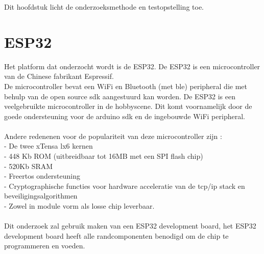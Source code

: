 \documentclass[../DCM2_Verslag.tex]{subfiles}
\begin{document}
Dit hoofdstuk licht de onderzoeksmethode en testopstelling toe. 

\section{ESP32}
Het platform dat onderzocht wordt is de ESP32. De ESP32 is een microcontroller van de Chinese fabrikant Espressif.\\ De microcontroller bevat een WiFi en Bluetooth (met ble) peripheral die met behulp van de open source sdk aangestuurd kan worden. De ESP32 is een veelgebruikte microcontroller in de hobbyscene. Dit komt voornamelijk door de goede ondersteuning voor de arduino sdk en de ingebouwde WiFi peripheral.
\\\\
Andere redenenen voor de populariteit van deze microcontroller zijn \parencite{esptechref}:\\
- De twee xTensa lx6 kernen\\
- 448 Kb ROM (uitbreidbaar tot 16MB met een SPI flash chip)\\
- 520Kb SRAM\\
- Freertos ondersteuning\\
- Cryptographische functies voor hardware acceleratie van de tcp/ip stack en beveiligingsalgorithmen\\
- Zowel in module vorm als losse chip leverbaar.\\\\
Dit onderzoek zal gebruik maken van een ESP32 development board, het ESP32 development board heeft alle randcomponenten benodigd om de chip te programmeren en voeden. \\
\newcommand{\sectionbreak}{\clearpage}
\end{document}

